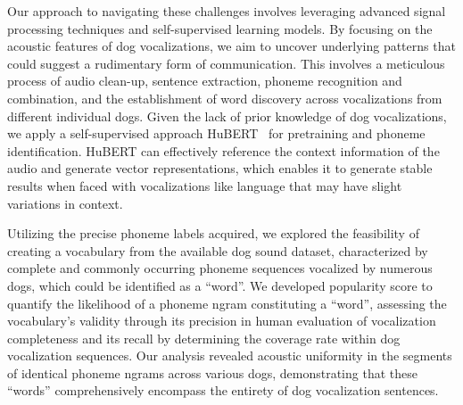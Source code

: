 Our approach to navigating these challenges involves leveraging advanced signal processing techniques and self-supervised learning models. By focusing on the acoustic features of dog vocalizations, we aim to uncover underlying patterns that could suggest a rudimentary form of communication. This involves a meticulous process of audio clean-up, sentence extraction, phoneme recognition and combination, and the establishment of word discovery across vocalizations from different individual dogs. Given the lack of prior knowledge of dog vocalizations, we apply a self-supervised approach HuBERT~\citep{hsu2021hubert} for pretraining and phoneme identification.
HuBERT can effectively reference the context information of the audio and generate vector representations, which enables it to generate stable results when faced with vocalizations like language that may have slight variations in context. 

Utilizing the precise phoneme labels acquired, we explored the feasibility of creating a vocabulary from the available dog sound dataset, characterized by complete and commonly occurring phoneme sequences vocalized by numerous dogs, which could be identified as a ``word''.
We developed popularity score to quantify the likelihood of a phoneme ngram constituting a ``word'', assessing the vocabulary's validity through its precision in human evaluation of vocalization completeness and its recall by determining the coverage rate within dog vocalization sequences. Our analysis revealed acoustic uniformity in the segments of identical phoneme ngrams across various dogs, demonstrating that these ``words'' comprehensively encompass the entirety of dog vocalization sentences.




